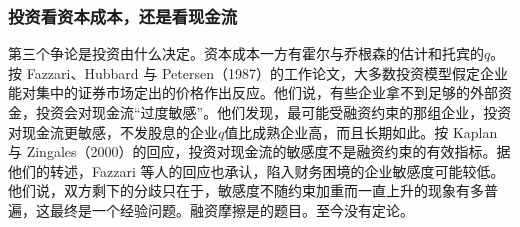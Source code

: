 \subsubsection{投资看资本成本，还是看现金流}

第三个争论是投资由什么决定。资本成本一方有霍尔与乔根森的估计和托宾的$q$。按 Fazzari、Hubbard 与 Petersen（1987）的工作论文，大多数投资模型假定企业能对集中的证券市场定出的价格作出反应\cite{fhp1987}。他们说，有些企业拿不到足够的外部资金，投资会对现金流“过度敏感”\cite{fhp1987}。他们发现，最可能受融资约束的那组企业，投资对现金流更敏感，不发股息的企业$q$值比成熟企业高，而且长期如此\cite{fhp1987}。按 Kaplan 与 Zingales（2000）的回应，投资对现金流的敏感度不是融资约束的有效指标\cite{kz2000}。据他们的转述，Fazzari 等人的回应也承认，陷入财务困境的企业敏感度可能较低\cite{kz2000}。他们说，双方剩下的分歧只在于，敏感度不随约束加重而一直上升的现象有多普遍，这最终是一个经验问题\cite{kz2000}。融资摩擦是的题目。至今没有定论。

